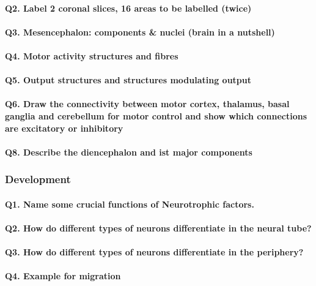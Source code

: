 \documentclass[12pt,article,oneside,a4paper]{memoir}
\begin{document}
\paragraph{Q2. Label 2 coronal slices, 16 areas to be labelled (twice)}
\paragraph{Q3. Mesencephalon: components \& nuclei (brain in a nutshell)}
\paragraph{Q4. Motor activity structures and fibres}
\paragraph{Q5. Output structures and structures modulating output}
\paragraph{Q6. Draw the connectivity between motor cortex, thalamus, basal ganglia and cerebellum for motor control and show which connections are excitatory or inhibitory}
\paragraph{Q8. Describe the diencephalon and ist major components}

\subsubsection{Development}
\paragraph{Q1. Name some crucial functions of Neurotrophic factors.}
\paragraph{Q2. How do different types of neurons differentiate in the neural tube?}
\paragraph{Q3. How do different types of neurons differentiate in the periphery?}
\paragraph{Q4. Example for migration}
\end{document}

